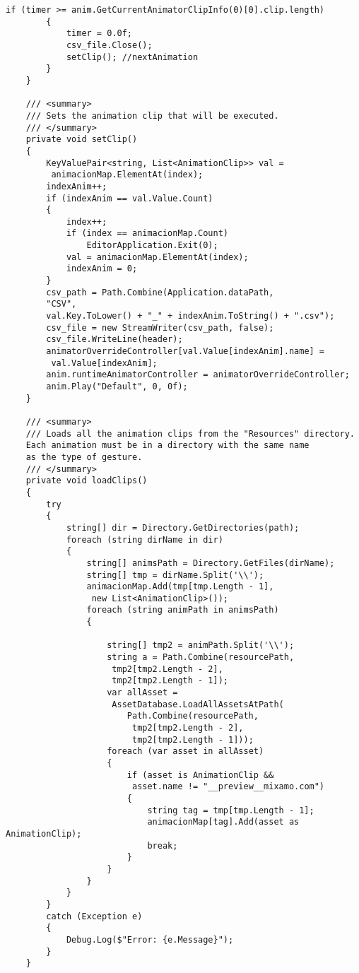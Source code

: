 \begin{lstlisting}[style=customcsharp, caption={Código de la herramienta MixamoDumper}, label={lst:MixamoDumperCode}]
        if (timer >= anim.GetCurrentAnimatorClipInfo(0)[0].clip.length)
        {
            timer = 0.0f;
            csv_file.Close();
            setClip(); //nextAnimation
        }
    }

    /// <summary>
    /// Sets the animation clip that will be executed.
    /// </summary>
    private void setClip()
    {
        KeyValuePair<string, List<AnimationClip>> val = 
         animacionMap.ElementAt(index);
        indexAnim++;
        if (indexAnim == val.Value.Count)
        {
            index++;
            if (index == animacionMap.Count)
                EditorApplication.Exit(0);
            val = animacionMap.ElementAt(index);
            indexAnim = 0;
        }
        csv_path = Path.Combine(Application.dataPath, 
        "CSV", 
        val.Key.ToLower() + "_" + indexAnim.ToString() + ".csv");
        csv_file = new StreamWriter(csv_path, false);
        csv_file.WriteLine(header);
        animatorOverrideController[val.Value[indexAnim].name] = 
         val.Value[indexAnim];
        anim.runtimeAnimatorController = animatorOverrideController;
        anim.Play("Default", 0, 0f);
    }

    /// <summary>
    /// Loads all the animation clips from the "Resources" directory.
    Each animation must be in a directory with the same name 
    as the type of gesture.
    /// </summary>
    private void loadClips()
    {
        try
        {
            string[] dir = Directory.GetDirectories(path);
            foreach (string dirName in dir)
            {
                string[] animsPath = Directory.GetFiles(dirName);
                string[] tmp = dirName.Split('\\');
                animacionMap.Add(tmp[tmp.Length - 1], 
                 new List<AnimationClip>());
                foreach (string animPath in animsPath)
                {

                    string[] tmp2 = animPath.Split('\\');
                    string a = Path.Combine(resourcePath, 
                     tmp2[tmp2.Length - 2], 
                     tmp2[tmp2.Length - 1]);
                    var allAsset = 
                     AssetDatabase.LoadAllAssetsAtPath(
                        Path.Combine(resourcePath, 
                         tmp2[tmp2.Length - 2], 
                         tmp2[tmp2.Length - 1]));
                    foreach (var asset in allAsset)
                    {
                        if (asset is AnimationClip && 
                         asset.name != "__preview__mixamo.com")
                        {
                            string tag = tmp[tmp.Length - 1];
                            animacionMap[tag].Add(asset as AnimationClip);
                            break;
                        }
                    }
                }
            }
        }
        catch (Exception e)
        {
            Debug.Log($"Error: {e.Message}");
        }
    }


\end{lstlisting}
